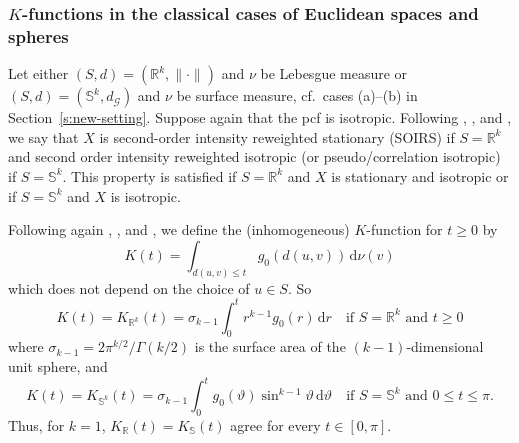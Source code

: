 \documentclass[alpha-refs]{wiley-article}
\begin{document}

\subsubsection{$K$-functions in the classical cases of Euclidean spaces and spheres}\label{s:3.2.1}

Let either $(S,d)=(\mathbb R^k,\|\cdot\|)$ and $\nu$ be Lebesgue measure or $(S,d)=(\mathbb S^k,d_{\mathcal G})$ and $\nu$ be surface measure, cf.\ cases (a)--(b) in Section~\ref{s:new-setting}. Suppose again that the pcf %
is isotropic. Following \citet{BMW}, \citet{LawrenceEtAl}, and \citet{MollerRubak}, we say that $X$ is second-order intensity reweighted stationary (SOIRS) if $S=\mathbb R^k$ and second order intensity reweighted
isotropic (or pseudo/correlation isotropic) if $S=\mathbb S^k$. 
This property is satisfied if $S=\mathbb R^k$ and $X$ is stationary and isotropic or if $S=\mathbb S^k$ and $X$ is isotropic. 

Following again \citet{BMW}, \citet{LawrenceEtAl}, and \citet{MollerRubak}, we define
the (inhomogeneous) $K$-function for $t\ge0$ by %
\begin{equation}\label{e:K1new}
K(t)=\int_{d(u,v)\le t} g_0(d(u,v))\,\mathrm d\nu(v)
\end{equation}
which does not depend on the choice of $u\in S$. 
So
\[K(t)={K_{\mathbb R^k}(t)=\sigma_{k-1} \int_0^t r^{k-1} g_0(r)\,\mathrm dr} \quad \text{if } S=\mathbb R^k \text{ and } t\ge0\]
where $\sigma_{k-1}=2\pi^{k/2}/\Gamma(k/2)$ is the surface area of the $(k-1)$-dimensional unit sphere, and
\[K(t)={K_{\mathbb S^k}(t)=\sigma_{k-1}\int_0^t g_0(\vartheta)\sin^{k-1}\vartheta\,\mathrm d\vartheta} \quad \text{if } S=\mathbb S^k \text{ and } 0\le t\le\pi.\]
 Thus, for $k=1$, $K_{\mathbb R}(t)=K_{\mathbb S}(t)$ agree for every $t\in[0,\pi]$.
\end{document}
